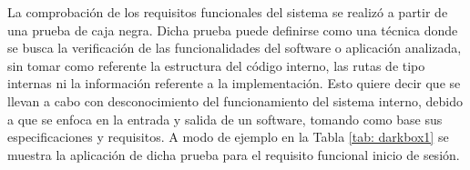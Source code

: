 La comprobación de los requisitos funcionales del sistema se realizó a partir de una prueba de caja negra. Dicha prueba puede definirse como una técnica donde se busca la verificación de las funcionalidades del software o aplicación analizada, sin tomar como referente la estructura del código interno, las rutas de tipo internas ni la información referente a la implementación. Esto quiere decir que se llevan a cabo con desconocimiento del funcionamiento del sistema interno, debido a que se enfoca en la entrada y salida de un software, tomando como base sus especificaciones y requisitos. A modo de ejemplo en la Tabla \ref{tab: darkbox1} se muestra la  aplicación de dicha prueba para el requisito funcional inicio de sesión.    

